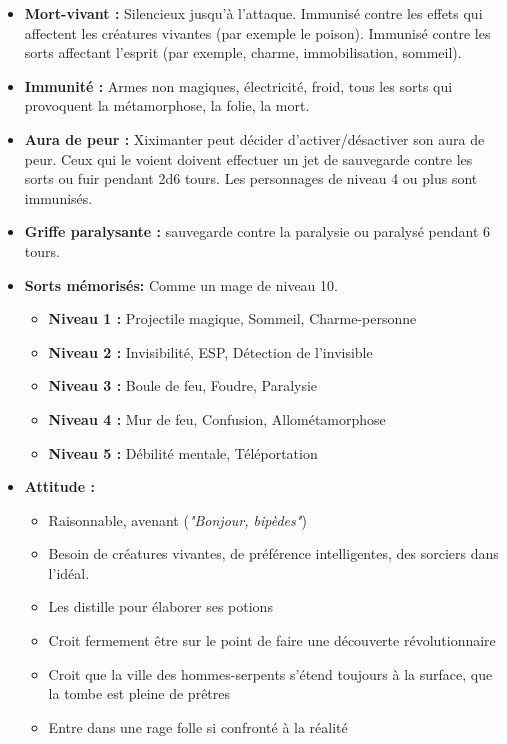 \begin{itemize}
  \item \textbf{Mort-vivant :} Silencieux jusqu'à l'attaque. 
  Immunisé contre les effets qui affectent les créatures vivantes (par exemple le poison). 
  Immunisé contre les sorts affectant l'esprit (par exemple, charme, immobilisation, sommeil).
  \item \textbf{Immunité :} Armes non magiques, électricité, froid, tous les sorts qui provoquent la métamorphose, la folie, la mort.
  \item \textbf{Aura de peur :} Xiximanter peut décider d'activer/désactiver son aura de peur. 
  Ceux qui le voient doivent effectuer un jet de sauvegarde contre les sorts ou fuir pendant 2d6 tours. 
  Les personnages de niveau 4 ou plus sont immunisés.
  \item \textbf{Griffe paralysante :} sauvegarde contre la paralysie ou paralysé pendant 6 tours.
  \item \textbf{Sorts mémorisés:} Comme un mage de niveau 10.
  \begin{itemize}
    \item \textbf{Niveau 1 :} Projectile magique, Sommeil, Charme-personne
    \item \textbf{Niveau 2 :} Invisibilité, ESP, Détection de l’invisible
    \item \textbf{Niveau 3 :} Boule de feu, Foudre, Paralysie
    \item \textbf{Niveau 4 :} Mur de feu, Confusion, Allométamorphose
    \item \textbf{Niveau 5 :} Débilité mentale, Téléportation
  \end{itemize}
  \item \textbf{Attitude :} 
  \begin{itemize}
    \item Raisonnable, avenant (\emph{"Bonjour, bipèdes"})
    \item Besoin de créatures vivantes, de préférence intelligentes, des sorciers dans l’idéal.
    \item Les distille pour élaborer ses potions
    \item Croit fermement être sur le point de faire une découverte révolutionnaire
    \item Croit que la ville des hommes-serpents s’étend toujours à la surface, que la tombe est pleine de prêtres
    \item Entre dans une rage folle si confronté à la réalité
  \end{itemize}
\end{itemize}